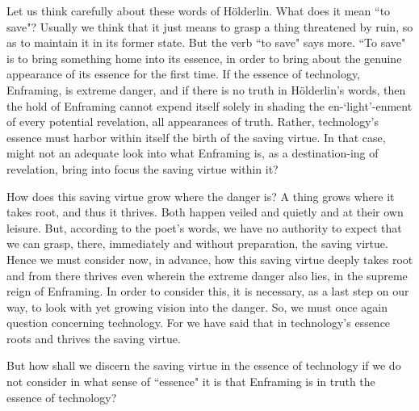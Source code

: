 \documentclass[paper=a4, fontsize=11pt,twoside]{scrartcl}
\begin{document}
Let us think carefully about these words of H{\"o}lderlin. What does it mean ``to save"? Usually we think that it just means to grasp a thing threatened by ruin, so as to maintain it in its former state. But the verb ``to save" says more. ``To save" is to bring something home into its essence, in order to bring about the genuine appearance of its essence for the first time. If the essence of technology, Enframing, is extreme danger, and if there is no truth in H{\"o}lderlin's words, then the hold of Enframing cannot expend itself solely in shading the en-`light'-enment of every potential revelation, all appearances of truth. Rather, technology's essence must harbor within itself the birth of the saving virtue. In that case, might not an adequate look into what Enframing is, as a destination-ing of revelation, bring into focus the saving virtue within it? 

How does this saving virtue grow where the danger is?  A thing grows where it takes root, and thus it thrives. Both happen veiled and quietly and at their own leisure.  But, according to the poet's words, we have no authority to expect that we can grasp, there, immediately and without preparation, the saving virtue. Hence we must consider now, in advance, how this saving virtue deeply takes root and from there thrives even wherein the extreme danger also lies, in the supreme reign of Enframing. In order to consider this, it is necessary, as a last step on our way, to look with yet growing vision into the danger. So, we must once again question concerning technology. For we have said that in technology's essence roots and thrives the saving virtue.

But how shall we discern the saving virtue in the essence of technology if we do not consider in what sense of ``essence" it is that Enframing is in truth the essence of technology?
\end{document}
